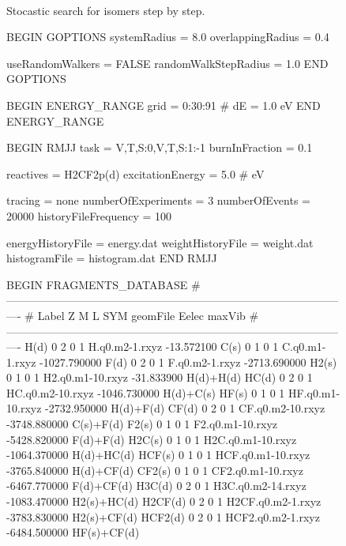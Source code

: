 \documentclass[a4paper,12pt]{article}
\begin{document}
\begin{figure}[h]
\begin{tabular}
\\\hline
\end{tabular}
\caption{\footnotesize{
Stocastic search for isomers step by step.
}}
\label{fig: search for isomer difluoromethane}
\end{figure}


\begin{figure}[h]

\begin{bbifile}[caption=M3C input file CH2F2+.m3c]
BEGIN GOPTIONS
	systemRadius = 8.0
	overlappingRadius = 0.4
	
	useRandomWalkers = FALSE
	randomWalkStepRadius = 1.0
END GOPTIONS

BEGIN ENERGY_RANGE
	grid  =  0:30:91  # dE = 1.0 eV
END ENERGY_RANGE

BEGIN RMJJ
	task = V,T,S:0,V,T,S:1:-1
	burnInFraction = 0.1
	
	reactives = H2CF2p(d)
	excitationEnergy = 5.0  # eV

	tracing = none
	numberOfExperiments = 3
	numberOfEvents  = 20000
	historyFileFrequency = 100
	
	energyHistoryFile = energy.dat
	weightHistoryFile = weight.dat
	histogramFile = histogram.dat
END RMJJ

BEGIN FRAGMENTS_DATABASE
	#----------------------------------------------------------------------------------------------
	#       Label    Z  M  L  SYM               geomFile               Eelec              maxVib
	#----------------------------------------------------------------------------------------------
		     H(d)    0  2  0    1         H.q0.m2-1.rxyz          -13.572100
		     C(s)    0  1  0    1         C.q0.m1-1.rxyz        -1027.790000
		     F(d)    0  2  0    1         F.q0.m2-1.rxyz        -2713.690000
		    H2(s)    0  1  0    1       H2.q0.m1-10.rxyz          -31.833900           H(d)+H(d)
		    HC(d)    0  2  0    1       HC.q0.m2-10.rxyz        -1046.730000           H(d)+C(s)
		    HF(s)    0  1  0    1       HF.q0.m1-10.rxyz        -2732.950000           H(d)+F(d)
		    CF(d)    0  2  0    1       CF.q0.m2-10.rxyz        -3748.880000           C(s)+F(d)
		    F2(s)    0  1  0    1       F2.q0.m1-10.rxyz        -5428.820000           F(d)+F(d)
		   H2C(s)    0  1  0    1      H2C.q0.m1-10.rxyz        -1064.370000          H(d)+HC(d)
		   HCF(s)    0  1  0    1      HCF.q0.m1-10.rxyz        -3765.840000          H(d)+CF(d)
		   CF2(s)    0  1  0    1      CF2.q0.m1-10.rxyz        -6467.770000          F(d)+CF(d)
		   H3C(d)    0  2  0    1      H3C.q0.m2-14.rxyz        -1083.470000         H2(s)+HC(d)
		  H2CF(d)    0  2  0    1      H2CF.q0.m2-1.rxyz        -3783.830000         H2(s)+CF(d)
		  HCF2(d)    0  2  0    1      HCF2.q0.m2-1.rxyz        -6484.500000         HF(s)+CF(d)
		

\end{bbifile}
\end{figure}
\end{document}
